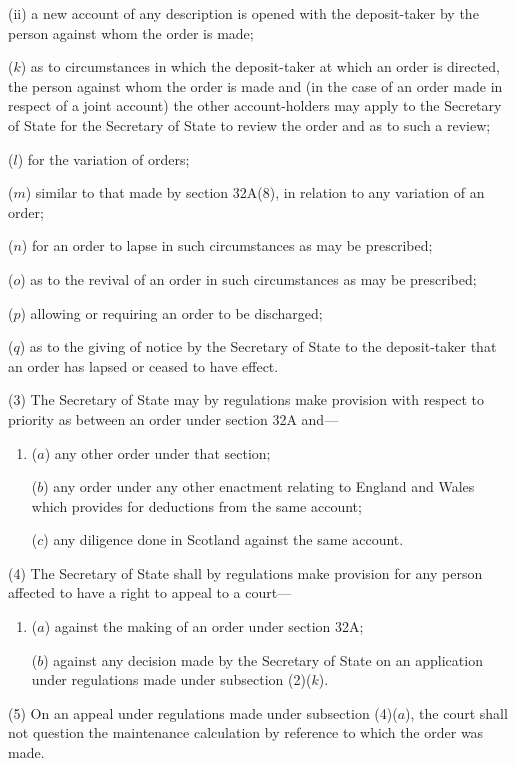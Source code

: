 \documentclass[a4paper]{article}
\begin{document}
\begin{enumerate}
\begin{enumerate}
(ii) a new account of any description is opened with the deposit-taker by
the person against whom the order is made;
\end{enumerate}

($k$) as to circumstances in which the deposit-taker at which an order is directed,
the person against whom the order is made and (in the case of an order made
in respect of a joint account) the other account-holders may apply to the
Secretary of State for the Secretary of State to review the order and as to
such a review;

($l$) for the variation of orders;

($m$) similar to that made by section 32A(8), in relation to any variation of an
order;

($n$) for an order to lapse in such circumstances as may be prescribed;

($o$) as to the revival of an order in such circumstances as may be prescribed;

($p$) allowing or requiring an order to be discharged;

($q$) as to the giving of notice by the Secretary of State to the deposit-taker that an
order has lapsed or ceased to have effect.
\end{enumerate}

(3)
The Secretary of State may by regulations make provision with respect to priority as between an order under section 32A and---
\begin{enumerate}\item[]
($a$) any other order under that section;

($b$) any order under any other enactment relating to England and Wales which
provides for deductions from the same account;

($c$) any diligence done in Scotland against the same account.
\end{enumerate}

(4)
The Secretary of State shall by regulations make provision for any person affected to have a right to appeal to a court---
\begin{enumerate}\item[]
($a$) against the making of an order under section 32A;

($b$) against any decision made by the Secretary of State on an application
under regulations made under subsection (2)($k$).
\end{enumerate}

(5)
On an appeal under regulations made under subsection (4)($a$), the court shall not question the maintenance calculation by reference to which the order was made.
\end{document}
